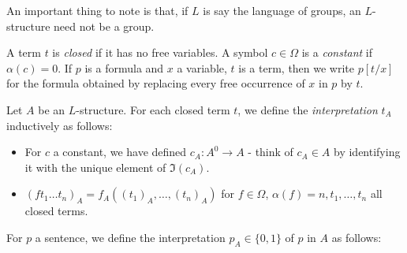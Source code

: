 \documentclass[10pt,a4paper]{article}
\begin{document}
An important thing to note is that, if $L$ is say the language of groups, an $L$-structure need not be a group.

A term $t$ is \emph{closed} if it has no free variables. A symbol $c \in \Omega$ is a \emph{constant} if $\alpha(c) = 0$. If $p$ is a formula and $x$ a variable, $t$ is a term, then we write $p[t/x]$ for the formula obtained by replacing every free occurrence of $x$ in $p$ by $t$.

Let $A$ be an $L$-structure. For each closed term $t$, we define the \emph{interpretation} $t_A$ inductively as follows:
\begin{itemize}
\item For $c$ a constant, we have defined $c_A : A^{0} \to A$ - think of $c_A \in A$ by identifying it with the unique element of $\Im(c_A)$. 

\item $(ft_1\ldots t_n)_A = f_A ((t_1)_A, \ldots, (t_n)_A)$ for $f \in \Omega$, $\alpha(f) = n, t_1, \ldots, t_n$ all closed terms.
\end{itemize}
For $p$ a sentence, we define the interpretation $p_A \in \{0,1\}$ of $p$ in $A$ as follows:
\end{document}
